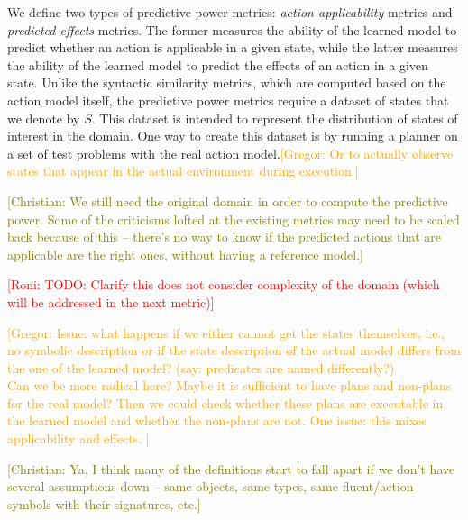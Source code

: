 \documentclass{article}
\theoremstyle{definition}
\theoremstyle{remark}
\newcommand{\roni}[1]{{\textcolor{red}{[Roni: #1]}}}
\newcommand{\gregor}[1]{{\textcolor{orange}{[Gregor: #1]}}}
\newcommand{\cm}[1]{{\textcolor{olive}{[Christian: #1]}}}
\begin{document}
We define two types of predictive power metrics: \emph{action applicability} metrics and \emph{predicted effects} metrics. 
The former measures the ability of the learned model to predict whether an action is applicable in a given state, while the latter measures the ability of the learned model to predict the effects of an action in a given state.
Unlike the syntactic similarity metrics, which are computed based on the action model itself, the predictive power metrics require a dataset of states that we denote by $S$. 
This dataset is intended to represent the distribution of states of interest in the domain. 
One way to create this dataset is by running a planner on a set of test problems with the real action model.\gregor{Or to actually observe states that appear in the actual environment during execution.}

\cm{We still need the original domain in order to compute the predictive power. Some of the criticisms lofted at the existing metrics may need to be scaled back because of this -- there's no way to know if the predicted actions that are applicable are the right ones, without having a reference model.}

\roni{TODO: Clarify this does not consider complexity of the domain (which will be addressed in the next metric)}

\gregor{Issue: what happens if we either cannot get the states themselves, i.e., no symbolic description or if the state description of the actual model differs from the one of the learned model? (say: predicates are named differently?)\\
Can we be more radical here? Maybe it is sufficient to have plans and non-plans for the real model? Then we could check whether these plans are executable in the learned model and whether the non-plans are not. One issue: this mixes applicability and effects.
}

\cm{Ya, I think many of the definitions start to fall apart if we don't have several assumptions down -- same objects, same types, same fluent/action symbols with their signatures, etc.}
\end{document}
